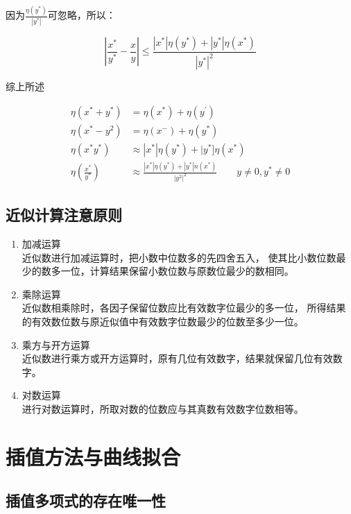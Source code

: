 \documentclass[12pt]{report}
\begin{document}
因为\( \frac{\eta (y^*)}{|y^*|} \)可忽略，所以：

\[
	|\frac{x^*}{y^*} - \frac{x}{y}|
	\leq \frac{|x^*|\eta (y^*) + |y^*|\eta(x^*)}{|y^*|^2}
\]

综上所述

\begin{align*}
	\eta(x^{*}+y^{*})         & = \eta(x^{*}) + \eta(y^{\prime})                     \\
	\eta(x^{*}-y^{2})         & = \eta(x^{-}) + \eta(y^{*})                          \\
	\eta(x^{*} y^{*})         & \approx |x^{*}|\eta(y^{*}) + |y^{*}] \eta (x^{*})    \\
	\eta(\frac{x^{*}}{y^{*}}) & \approx \frac{|x^{*}|\eta(y^{*}) + |y^{*}| n(x^{*})}
	{|y^{2}|^{2}} \qquad y \neq 0, y^{*} \neq 0
\end{align*}

\section{近似计算注意原则}

\begin{enumerate}
	\item 加减运算  \\
	      近似数进行加减运算时，把小数中位数多的先四舍五入，
	      使其比小数位数最少的数多一位，计算结果保留小数位数与原数位最少的数相同。
	\item 乘除运算  \\
	      近似数相乘除时，各因子保留位数应比有效数字位最少的多一位，
	      所得结果的有效数位数与原近似值中有效数字位数最少的位数至多少一位。
	\item 乘方与开方运算  \\
	      近似数进行乘方或开方运算时，原有几位有效数字，结果就保留几位有效数字。
	\item 对数运算  \\
	      进行对数运算时，所取对数的位数应与其真数有效数字位数相等。
\end{enumerate}

\chapter{插值方法与曲线拟合}

\section{插值多项式的存在唯一性}
\end{document}
